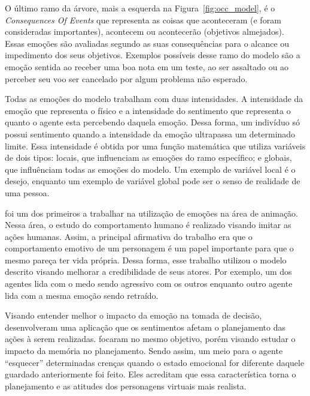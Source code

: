 O último ramo da árvore, mais a esquerda na Figura~\ref{fig:occ_model}, é o
\emph{Consequences Of Events} que representa as coisas que aconteceram (e
foram consideradas importantes), acontecem ou acontecerão (objetivos
almejados)\dev{}. Essas emoções são avaliadas segundo as suas consequências
para o alcance ou impedimento dos seus objetivos. Exemplos possíveis desse
ramo do modelo são a emoção sentida ao receber uma boa nota em um teste, ao
ser assaltado ou ao perceber seu voo ser cancelado por algum problema não
esperado.

Todas as emoções do modelo trabalham com duas intensidades. A intensidade da
emoção que representa o físico e a intensidade do sentimento que representa o
quanto o agente esta percebendo daquela emoção. Dessa forma, um indivíduo só
possui sentimento quando a intensidade da emoção ultrapassa um
determinado limite\dev{}.  Essa intensidade é obtida por uma função matemática
que utiliza variáveis de dois tipos: locais, que influenciam as emoções do ramo
específico; e globais, que influênciam todas as emoções do modelo.  Um exemplo
de variável local é o desejo, enquanto um exemplo de variável global pode ser
o senso de realidade de uma pessoa.

\citet{bates1994role} foi um dos primeiros a trabalhar na utilização de emoções
na área de animação. Nessa área, o estudo do comportamento humano é realizado
visando imitar as ações humanas. Assim, a principal afirmativa do trabalho era
que o comportamento emotivo de um personagem é um papel importante para que o
mesmo pareça ter vida própria. Dessa forma, esse trabalho utilizou o modelo
descrito visando melhorar a credibilidade de seus atores. Por exemplo, um dos
agentes lida com o medo sendo agressivo com os outros enquanto outro agente
lida com a mesma emoção sendo retraído.


Visando entender melhor o impacto da emoção na tomada de decisão,
\citet{zhang2009emotional} desenvolveram uma aplicação que os sentimentos
afetam o planejamento das ações à serem realizadas.
\citet{neto2010construction} focaram no mesmo objetivo, porém visando estudar
o impacto da memória no planejamento. Sendo assim, um meio para o agente
``esquecer'' determinadas crenças quando o estado emocional for diferente
daquele guardado anteriormente foi feito. Eles acreditam que essa
característica torna o planejamento e as atitudes dos personagens virtuais
mais realista.

